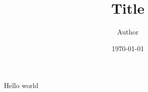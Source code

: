 \documentclass[10pt]{article}
\begin{document}
 

\author{Author}

\title{Title}

\date{\today}

\maketitle



\titlepage

Hello world
\end{document}
